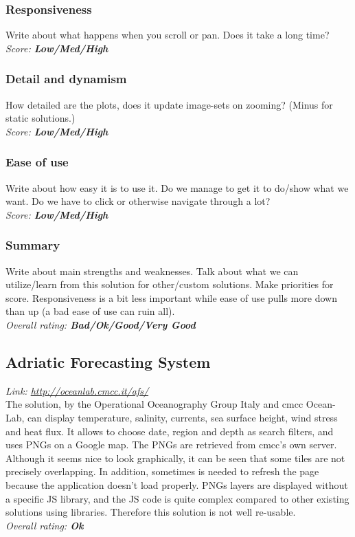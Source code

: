 \documentclass[11pt,a4paper,titlepage,oneside]{report}
\begin{document}
\subsubsection{Responsiveness}
Write about what happens when you scroll or pan. Does it take a long time?
\\ \emph{Score: \textbf{Low/Med/High}}
\subsubsection{Detail and dynamism}
How detailed are the plots, does it update image-sets on zooming? (Minus for static solutions.) 
\\ \emph{Score: \textbf{Low/Med/High}}
\subsubsection{Ease of use}
Write about how easy it is to use it. Do we manage to get it to do/show what we want. Do we have to click or otherwise navigate through a lot?
\\ \emph{Score: \textbf{Low/Med/High}}
\subsubsection{Summary}
Write about main strengths and weaknesses. Talk about what we can utilize/learn from this solution for other/custom solutions. Make priorities for score. Responsiveness is a bit less important while ease of use pulls more down than up (a bad ease of use can ruin all).
\\ \emph{Overall rating: \textbf{Bad/Ok/Good/Very Good}}

\subsection{Adriatic Forecasting System}
\emph{Link: \url{http://oceanlab.cmcc.it/afs/}} \\%
  The solution, by the Operational Oceanography Group Italy and cmcc Ocean-Lab, can display temperature, salinity, currents, sea surface height, wind stress and heat flux. It allows to choose date, region and depth as search filters, and uses PNGs on a Google map. The PNGs are retrieved from cmcc's own server.
  Although it seems nice to look graphically, it can be seen that some tiles are not precisely overlapping. In addition, sometimes is needed to refresh the page because the application doesn't load properly. PNGs layers are displayed without a specific JS library, and the JS code is quite complex compared to other existing solutions using libraries. Therefore this solution is not well re-usable.
\\ \emph{Overall rating: \textbf{Ok}}
\end{document}
